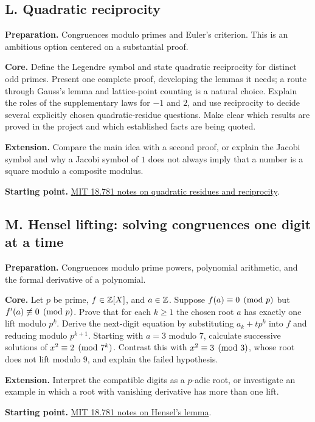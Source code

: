 \begin{capstoneproject}
\subsection*{L. Quadratic reciprocity}
\textbf{Preparation.} Congruences modulo primes and Euler's criterion.
This is an ambitious option centered on a substantial proof.

\textbf{Core.} Define the Legendre symbol and state quadratic reciprocity
for distinct odd primes. Present one complete proof, developing the
lemmas it needs; a route through Gauss's lemma and lattice-point counting
is a natural choice. Explain the roles of the supplementary laws for
$-1$ and $2$, and use reciprocity to decide several explicitly chosen
quadratic-residue questions. Make clear which results are proved in the
project and which established facts are being quoted.

\textbf{Extension.} Compare the main idea with a second proof, or explain
the Jacobi symbol and why a Jacobi symbol of $1$ does not always imply
that a number is a square modulo a composite modulus.

\textbf{Starting point.}
\href{https://ocw.mit.edu/courses/18-781-theory-of-numbers-spring-2012/resources/mit18_781s12_lec9/}{MIT 18.781 notes on quadratic residues and reciprocity}.

\end{capstoneproject}

\begin{capstoneproject}
\subsection*{M. Hensel lifting: solving congruences one digit at a time}
\textbf{Preparation.} Congruences modulo prime powers, polynomial
arithmetic, and the formal derivative of a polynomial.

\textbf{Core.} Let $p$ be prime, $f\in\mathbb Z[X]$, and $a\in\mathbb Z$. Suppose
$f(a)\equiv0\pmod p$ but $f'(a)\not\equiv0\pmod p$.
Prove that for each $k\ge1$ the chosen root $a$ has exactly one lift
modulo $p^k$. Derive the next-digit equation by substituting
$a_k+tp^k$ into $f$ and reducing modulo $p^{k+1}$.
Starting with $a=3$ modulo $7$, calculate successive solutions of
$x^2\equiv2\pmod{7^k}$. Contrast this with $x^2\equiv3\pmod3$,
whose root does not lift modulo $9$, and explain the failed hypothesis.

\textbf{Extension.} Interpret the compatible digits as a $p$-adic root,
or investigate an example in which a root with vanishing derivative
has more than one lift.

\textbf{Starting point.}
\href{https://ocw.mit.edu/courses/18-781-theory-of-numbers-spring-2012/resources/mit18_781s12_lec6/}{MIT 18.781 notes on Hensel's lemma}.

\end{capstoneproject}

